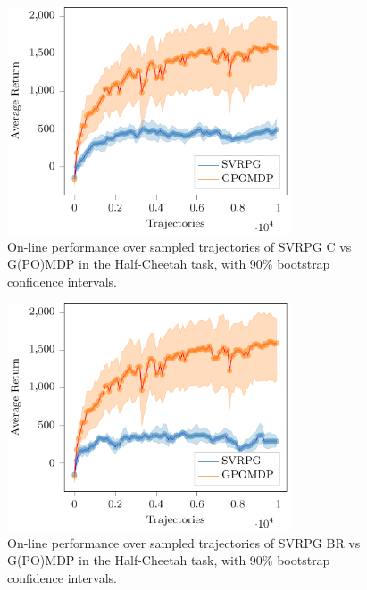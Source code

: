 \begin{figure}[h]
	\begin{minipage}[h]{1\textwidth}
		\centering
		\includegraphics[width=0.75\textwidth]{Images/Experiments/half_cheetah_GPOMDP_vs_NonSelf_SVRPG_C.pdf}
		\vspace{-0.1in}
		\caption{On-line performance over sampled trajectories of \acs{SVRPG} C vs G(PO)MDP in the Half-Cheetah task, with 90\% bootstrap confidence intervals.}
		\label{fig:hcfour}
	\end{minipage}
	\vspace{-0.15in}
\end{figure}

\begin{figure}[h]
	\begin{minipage}[h]{1\textwidth}
		\centering
		\includegraphics[width=0.75\textwidth]{Images/Experiments/half_cheetah_GPOMDP_vs_SVRPG_B_reuse.pdf}
		\vspace{-0.1in}
		\caption{On-line performance over sampled trajectories of \acs{SVRPG} BR vs G(PO)MDP in the Half-Cheetah task, with 90\% bootstrap confidence intervals.}
		\label{fig:hcnine}
	\end{minipage}
	\vspace{-0.15in}
\end{figure}

